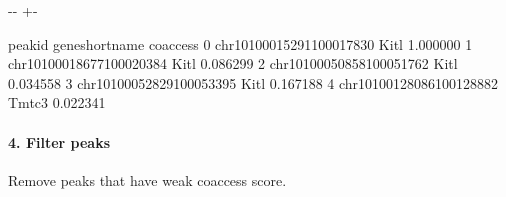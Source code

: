 \documentclass[letterpaper,10pt,english]{sphinxmanual}
\newlength\nbsphinxcodecellspacing
\begin{document}
{

\kern-\sphinxverbatimsmallskipamount\kern-\baselineskip
\kern+\FrameHeightAdjust\kern-\fboxrule
\vspace{\nbsphinxcodecellspacing}

%
\begin{sphinxVerbatim}[commandchars=\\\{\}]
\llap{\color{nbsphinxout}[8]:\,\hspace{\fboxrule}\hspace{\fboxsep}}                     peak\PYGZus{}id gene\PYGZus{}short\PYGZus{}name  coaccess
0  chr10\PYGZus{}100015291\PYGZus{}100017830            Kitl  1.000000
1  chr10\PYGZus{}100018677\PYGZus{}100020384            Kitl  0.086299
2  chr10\PYGZus{}100050858\PYGZus{}100051762            Kitl  0.034558
3  chr10\PYGZus{}100052829\PYGZus{}100053395            Kitl  0.167188
4  chr10\PYGZus{}100128086\PYGZus{}100128882           Tmtc3  0.022341
\end{sphinxVerbatim}
}


\paragraph{4. Filter peaks}
\label{\detokenize{notebooks/01_ATAC-seq_data_processing/option1_scATAC-seq_data_analysis_with_cicero/02_preprocess_peak_data:4.-Filter-peaks}}
Remove peaks that have weak coaccess score.

{
%
\begin{sphinxVerbatim}[commandchars=\\\{\}]
\llap{\color{nbsphinxin}[9]:\,\hspace{\fboxrule}\hspace{\fboxsep}}  \PYG{p}{[}  \PYG{p}{]}
  \PYG{p}{[}\PYG{p}{[} \PYG{p}{]}\PYG{p}{]}
\end{sphinxVerbatim}
}
\end{document}
